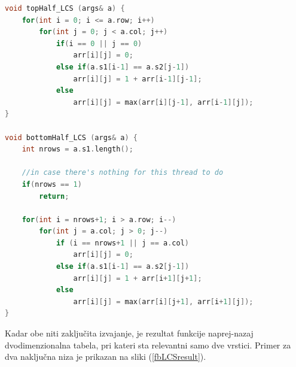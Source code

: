 \documentclass[a4paper,12pt,openright]{book}
\begin{document}
\bigskip
\begin{lstlisting}[language=C++, caption={Vsaka nit računa svojo polovico tabele}, captionpos=b, label=fbLCSthreads]
void topHalf_LCS (args& a) {
    for(int i = 0; i <= a.row; i++) 
        for(int j = 0; j < a.col; j++)
            if(i == 0 || j == 0)
                arr[i][j] = 0;        
            else if(a.s1[i-1] == a.s2[j-1])
                arr[i][j] = 1 + arr[i-1][j-1];
            else 
                arr[i][j] = max(arr[i][j-1], arr[i-1][j]);
}

void bottomHalf_LCS (args& a) {
    int nrows = a.s1.length();

    //in case there's nothing for this thread to do
    if(nrows == 1)
        return;

    for(int i = nrows+1; i > a.row; i--) 
        for(int j = a.col; j > 0; j--) 
            if (i == nrows+1 || j == a.col) 
                arr[i][j] = 0;
            else if(a.s1[i-1] == a.s2[j-1])
                arr[i][j] = 1 + arr[i+1][j+1];
            else
                arr[i][j] = max(arr[i][j+1], arr[i+1][j]);
}
\end{lstlisting}

Kadar obe niti zaključita izvajanje, je rezultat funkcije naprej-nazaj dvodimenzionalna tabela, pri kateri sta relevantni samo dve vrstici. Primer za dva naključna niza je prikazan na sliki (\ref{fbLCSresult}).
\end{document}
